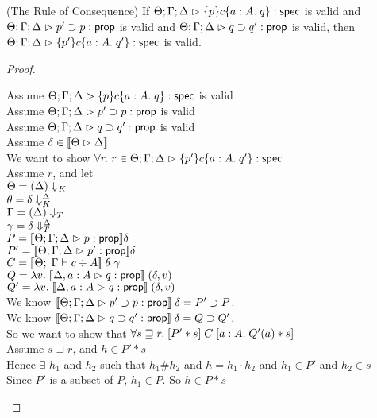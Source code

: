 \begin{lemma}{(The Rule of Consequence)}
If $\judgeS{\spec{p}{c}{a:A}{q}}$ is valid and $\judgeA{p' \implies p}{\assert}$ is valid
and $\judgeA{q \implies q'}{\assert}$ is valid, then $\judgeS{\spec{p'}{c}{a:A}{q'}}$ is valid.
\end{lemma}
\begin{proof}
\begin{tabbedproof}
\oo Assume $\judgeS{\spec{p}{c}{a:A}{q}}$ is valid \\
\oo Assume $\judgeA{p' \implies p}{\assert}$ is valid \\
\oo Assume $\judgeA{q \implies q'}{\assert}$ is valid \\
\oo Assume $\delta \in \interp{\judgeACtx{\Delta}}$ \\
\ooo We want to show $\forall r.\; r \in \judgeS{\spec{p'}{c}{a:A}{q'}}$ \\
\ooo Assume $r$, and let \\
\ooox $\Theta = \restrictkind{\Delta}$ \\
\ooox $\theta = \restricttyenv{\Delta}{\delta}$ \\
\ooox $\Gamma = \restricttype{\Delta}$ \\
\ooox $\gamma = \restrictvals{\Delta}{\delta}$ \\
\ooox $P = \interp{\judgeA{p}{\assert}}\delta$ \\
\ooox $P' = \interp{\judgeA{p'}{\assert}}\delta$ \\
\ooox $C = \interp{\judgeC{\Gamma}{c}{A}}\;\theta\;\gamma$ \\
\ooox $Q = \semfun{v}{\interp{\judgeA[\Delta,a:A]{q}{\assert}}\;(\delta,v)}$ \\
\ooox $Q' = \semfun{v}{\interp{\judgeA[\Delta,a:A]{q}{\assert}}\;(\delta,v)}$ \\
\ooo We know $\interp{\judgeA{p' \implies p}{\assert}}\;\delta = P' \implies P$. \\
\ooo We know $\interp{\judgeA{q \implies q'}{\assert}}\;\delta = Q \implies Q'$. \\
\ooo So we want to show that $\forall s \sqsupseteq r.\; \basicspec{P' * s}{C}{a:A}{Q'(a) * s}$ \\
\ooo Assume $s \sqsupseteq r$, and $h \in P' * s$ \\
\oooo Hence $\exists$ $h_1$ and $h_2$ such that $h_1 \# h_2$ and $h = h_1 \cdot h_2$ 
     and $h_1 \in P'$ and $h_2 \in s$ \\
\oooo Since $P'$ is a subset of $P$, $h_1 \in P$. So $h \in P * s$ \\

\end{tabbedproof}
\end{proof}
